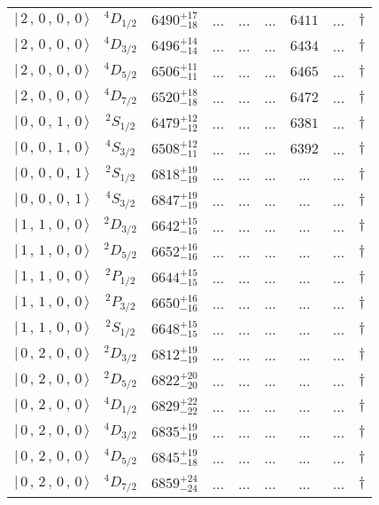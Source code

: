 \begin{tabular}{c c| c c c c c c c}
$\vert \,2\,,\,0\,,\,0\,,\,0 \,\rangle $ & $^{4}D_{1/2}$ & $6490^{+17}_{-18}$ & ... & ... & ... & $6411$ & ... & $\dagger$ \\ 
$\vert \,2\,,\,0\,,\,0\,,\,0 \,\rangle $ & $^{4}D_{3/2}$ & $6496^{+14}_{-14}$ & ... & ... & ... & $6434$ & ... & $\dagger$ \\ 
$\vert \,2\,,\,0\,,\,0\,,\,0 \,\rangle $ & $^{4}D_{5/2}$ & $6506^{+11}_{-11}$ & ... & ... & ... & $6465$ & ... & $\dagger$ \\ 
$\vert \,2\,,\,0\,,\,0\,,\,0 \,\rangle $ & $^{4}D_{7/2}$ & $6520^{+18}_{-18}$ & ... & ... & ... & $6472$ & ... & $\dagger$ \\ 
$\vert \,0\,,\,0\,,\,1\,,\,0 \,\rangle $ & $^{2}S_{1/2}$ & $6479^{+12}_{-12}$ & ... & ... & ... & $6381$ & ... & $\dagger$ \\ 
$\vert \,0\,,\,0\,,\,1\,,\,0 \,\rangle $ & $^{4}S_{3/2}$ & $6508^{+12}_{-11}$ & ... & ... & ... & $6392$ & ... & $\dagger$ \\ 
$\vert \,0\,,\,0\,,\,0\,,\,1 \,\rangle $ & $^{2}S_{1/2}$ & $6818^{+19}_{-19}$ & ... & ... & ... & ... & ... & $\dagger$ \\ 
$\vert \,0\,,\,0\,,\,0\,,\,1 \,\rangle $ & $^{4}S_{3/2}$ & $6847^{+19}_{-19}$ & ... & ... & ... & ... & ... & $\dagger$ \\ 
$\vert \,1\,,\,1\,,\,0\,,\,0 \,\rangle $ & $^{2}D_{3/2}$ & $6642^{+15}_{-15}$ & ... & ... & ... & ... & ... & $\dagger$ \\ 
$\vert \,1\,,\,1\,,\,0\,,\,0 \,\rangle $ & $^{2}D_{5/2}$ & $6652^{+16}_{-16}$ & ... & ... & ... & ... & ... & $\dagger$ \\ 
$\vert \,1\,,\,1\,,\,0\,,\,0 \,\rangle $ & $^{2}P_{1/2}$ & $6644^{+15}_{-15}$ & ... & ... & ... & ... & ... & $\dagger$ \\ 
$\vert \,1\,,\,1\,,\,0\,,\,0 \,\rangle $ & $^{2}P_{3/2}$ & $6650^{+16}_{-16}$ & ... & ... & ... & ... & ... & $\dagger$ \\ 
$\vert \,1\,,\,1\,,\,0\,,\,0 \,\rangle $ & $^{2}S_{1/2}$ & $6648^{+15}_{-15}$ & ... & ... & ... & ... & ... & $\dagger$ \\ 
$\vert \,0\,,\,2\,,\,0\,,\,0 \,\rangle $ & $^{2}D_{3/2}$ & $6812^{+19}_{-19}$ & ... & ... & ... & ... & ... & $\dagger$ \\ 
$\vert \,0\,,\,2\,,\,0\,,\,0 \,\rangle $ & $^{2}D_{5/2}$ & $6822^{+20}_{-20}$ & ... & ... & ... & ... & ... & $\dagger$ \\ 
$\vert \,0\,,\,2\,,\,0\,,\,0 \,\rangle $ & $^{4}D_{1/2}$ & $6829^{+22}_{-22}$ & ... & ... & ... & ... & ... & $\dagger$ \\ 
$\vert \,0\,,\,2\,,\,0\,,\,0 \,\rangle $ & $^{4}D_{3/2}$ & $6835^{+19}_{-19}$ & ... & ... & ... & ... & ... & $\dagger$ \\ 
$\vert \,0\,,\,2\,,\,0\,,\,0 \,\rangle $ & $^{4}D_{5/2}$ & $6845^{+19}_{-18}$ & ... & ... & ... & ... & ... & $\dagger$ \\ 
$\vert \,0\,,\,2\,,\,0\,,\,0 \,\rangle $ & $^{4}D_{7/2}$ & $6859^{+24}_{-24}$ & ... & ... & ... & ... & ... & $\dagger$ \\ 
\hline \hline
\end{tabular}
